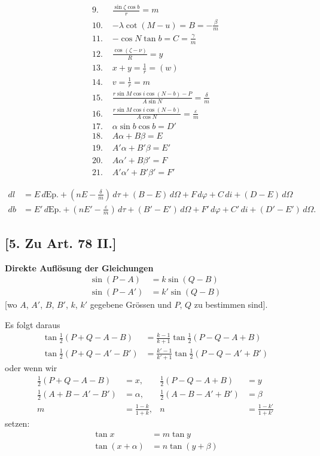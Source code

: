 \documentclass[12pt,a4paper]{article}
\begin{document}
\newpage

\begin{align*}
\text{9. } & \frac{\sin\zeta \cos b}{r} = m \\
\text{10. } & -\lambda \cot(M - u) = B = -\frac{\beta}{m} \\
\text{11. } & -\cos N \tan b = C = \frac{\gamma}{m} \\
\text{12. } & \frac{\cos(\zeta - \nu)}{R} = y \\
\text{13. } & x + y = \frac{1}{r} = (w) \\
\text{14. } & v = \frac{1}{r} = m \\
\text{15. } & \frac{r\sin M \cos i \cos(N - b) - P}{A\sin N} = \frac{\delta}{m} \\
\text{16. } & \frac{r\sin M \cos i \cos(N - b)}{A\cos N} = \frac{\varepsilon}{m} \\
\text{17. } & \alpha\sin b \cos b = D' \\
\text{18. } & A\alpha + B\beta = E \\
\text{19. } & A'\alpha + B'\beta = E' \\
\text{20. } & A\alpha' + B\beta' = F \\
\text{21. } & A'\alpha' + B'\beta' = F'
\end{align*}

\begin{align*}
dl &= E\,d\text{Ep.} + (nE - \tfrac{\delta}{m})\,d\tau + (B - E)\,d\Omega + F\,d\varphi + C\,di + (D - E)\,d\Omega \\
db &= E'\,d\text{Ep.} + (nE' - \tfrac{\varepsilon}{m})\,d\tau + (B' - E')\,d\Omega + F'\,d\varphi + C'\,di + (D' - E')\,d\Omega.
\end{align*}

\subsection*{[5. Zu Art. 78 II.]}
\textbf{Direkte Aufl\"osung der Gleichungen}
\begin{align}
\tag{1} \sin(P - A) &= k\sin(Q - B) \\
\tag{2} \sin(P - A') &= k'\sin(Q - B)
\end{align}
[wo $A$, $A'$, $B$, $B'$, $k$, $k'$ gegebene Gr\"ossen und $P$, $Q$ zu bestimmen sind].

Es folgt daraus
\begin{align*}
\tan\tfrac{1}{2}(P + Q - A - B) &= \frac{k - 1}{k + 1} \tan\tfrac{1}{2}(P - Q - A + B) \\
\tan\tfrac{1}{2}(P + Q - A' - B') &= \frac{k' - 1}{k' + 1} \tan\tfrac{1}{2}(P - Q - A' + B')
\end{align*}
oder wenn wir
\begin{align*}
\tfrac{1}{2}(P + Q - A - B) &= x, & \tfrac{1}{2}(P - Q - A + B) &= y \\
\tfrac{1}{2}(A + B - A' - B') &= \alpha, & \tfrac{1}{2}(A - B - A' + B') &= \beta \\
m &= \frac{1 - k}{1 + k}, & n &= \frac{1 - k'}{1 + k'}
\end{align*}
setzen:
\begin{align}
\tag{3} \tan x &= m\tan y \\
\tag{4} \tan(x + \alpha) &= n\tan(y + \beta)
\end{align}
\end{document}
